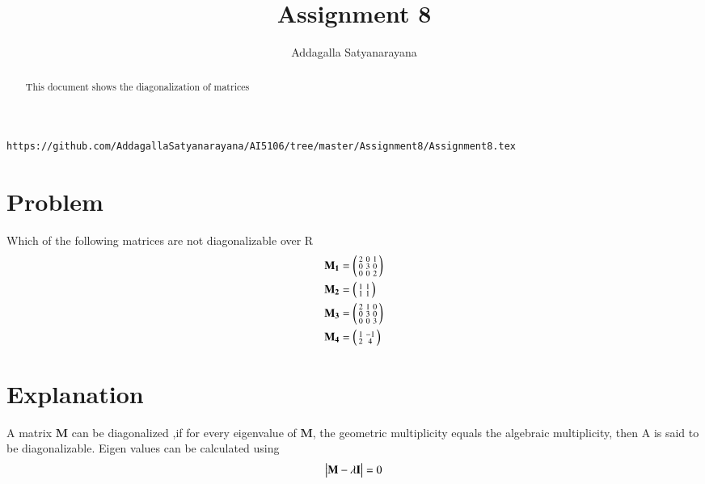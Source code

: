 \documentclass[journal,12pt,twocolumn]{IEEEtran}
\begin{document}
	\makeatother
	\let\StandardTheFigure\thefigure
	\let\vec\mathbf
	\renewcommand{\thefigure}{\theproblem}
	\def\putbox#1#2#3{\makebox[0in][l]{\makebox[#1][l]{}\raisebox{\baselineskip}[0in][0in]{\raisebox{#2}[0in][0in]{#3}}}}
	\def\rightbox#1{\makebox[0in][r]{#1}}
	\def\centbox#1{\makebox[0in]{#1}}
	\def\topbox#1{\raisebox{-\baselineskip}[0in][0in]{#1}}
	\def\midbox#1{\raisebox{-0.5\baselineskip}[0in][0in]{#1}}
	\vspace{3cm}
	\title{Assignment 8}
	\author{Addagalla Satyanarayana}
	\maketitle
	\newpage
	\bigskip
	\renewcommand{\thefigure}{\theenumi}
	\renewcommand{\thetable}{\theenumi}
\begin{abstract}
This document shows the diagonalization of matrices
\end{abstract}

%
\begin{lstlisting}
https://github.com/AddagallaSatyanarayana/AI5106/tree/master/Assignment8/Assignment8.tex
\end{lstlisting}
%
\section{Problem}
	Which of the following matrices are not diagonalizable over R
\begin{align}
\vec{M_1}&=\myvec{2&0&1\\0&3&0\\0 & 0&2}\\
\vec{M_2}&=\myvec{1&1\\1&1}\\
\vec{M_3}&=\myvec{2&1&0\\0&3&0\\0 & 0&3}\\
\vec{M_4}&=\myvec{1&-1\\2&4}
\end{align}

\section{Explanation}
A matrix $\vec{M}$ can be diagonalized ,if for every eigenvalue of $\vec{M}$, the geometric multiplicity equals the algebraic multiplicity, then A is said to be diagonalizable.
Eigen values can be calculated using
\begin{align}
	\mydet{\vec{M}-\lambda\vec{I}}=0\label{eq:2}
\end{align}
\end{document}
